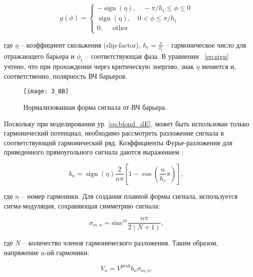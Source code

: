 \begin{equation}
g(\phi)=\left\{\begin{array}{c}
-\operatorname{sign}(\eta),\quad -\pi / h_{\textrm{r}} \leq \phi \leq 0 \\
\operatorname{sign}(\eta),\quad 0<\phi \leq \pi / h_{\textrm{r}} \\
0, \quad \text { other }
\end{array}\right.
\label{eq:sign}
\end{equation}

\noindent где $\eta$ – коэффициент скольжения (slip-factor), $h_{\textrm{r}}=\frac{\pi}{\phi_{\textrm{r}}}$ – гармоническое число для отражающего барьера и $\phi_{\textrm{r}}$ – соответствующая фаза.  В у\-рав\-не\-нии~ \ref{eq:sign} учтено, что при прохождении через критическую энергию, знак $\eta$ меняется и, соответственно, полярность ВЧ барьеров.

\begin{figure}[!h]
  \centering
   \texttt{[image: 3\_BB]}
   \caption{Нормализованная форма сигнала от ВЧ барьера.}
   \label{fig:rf}
\end{figure}

\par Поскольку при моделировании ур. \ref{eq:blond_dE}, может быть использован только гармонический потенциал, необходимо рассмотреть разложение сигнала в соответствующий гармонический ряд. Коэффициенты Фурье-разложения для приведенного прямоугольного сигнала даются выражением \cite{cern:bb}:

\begin{equation}
b_n=\operatorname{sign}{\left(\eta\right)}\frac{2}{n\pi}\left[1-\cos{\left(\frac{n}{h_r}\pi\right)}\right],
\label{b}
\end{equation}

\noindent где $n$ – номер гармоники. Для создания плавной формы сигнала, используется сигма-модуляция, сохраняющая симметрию сигнала:

\begin{equation}
\sigma_{m, n}={\text{sinc}}^m{\frac{n\pi}{2\left(N+1\right)}},
\label{sigma}
\end{equation}

\noindent где $N$ – количество членов гармонического разложения. Таким образом, напряжение n-ой гармоники:

\begin{equation}
V_n=V^{\textrm{peak}}b_n\sigma_{m, n}.
\label{Volt_n}
\end{equation}

